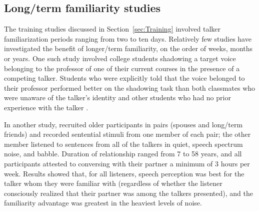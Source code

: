 \subsection{Long\-/term familiarity studies\label{sec:LongTerm}}
The training studies discussed in Section~\ref{sec:Training} involved talker familiarization periods ranging from two to ten days.  Relatively few studies have investigated the benefit of longer\-/term familiarity, on the order of weeks, months or years.  One such study involved college students shadowing a target voice belonging to the professor of one of their current courses in the presence of a competing talker.  Students who were explicitly told that the voice belonged to their professor performed better on the shadowing task than both classmates who were unaware of the talker’s identity and other students who had no prior experience with the talker \citep{NewmanEvers2007}.  

In another study, \citet{SouzaEtAl2013} recruited older participants in pairs (spouses and long\-/term friends) and recorded sentential stimuli from one member of each pair; the other member listened to sentences from all of the talkers in quiet, speech spectrum noise, and babble.  Duration of relationship ranged from 7 to 58 years, and all participants attested to conversing with their partner a minimum of 3 hours per week.  Results showed that, for all listeners, speech perception was best for the talker whom they were familiar with (regardless of whether the listener consciously realized that their partner was among the talkers presented), and the familiarity advantage was greatest in the heaviest levels of noise.



